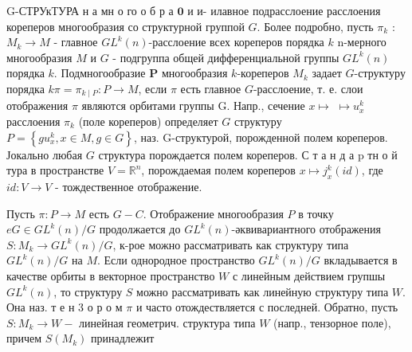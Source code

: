 \documentclass[10pt]{article}
\begin{document}
G-СТРУкТУРА н а мн о го о б р а $\mathbf{0}$ и и- илавное подрасслоение расслоения кореперов многообразия со структурной группой $G$. Более подробно, пусть $\pi_{k}$ : $M_{k} \rightarrow M$ - главное $G L^{k}(n)$-расслоение всех кореперов порядка $k$ n-мерного многообразия $M$ и $G$ - подгруппа общей дифференциальной группы $G L^{k}(n)$ порядка $k$. Подмногообразие $\boldsymbol{P}$ многообразия $k$-кореперов $M_{k}$ задает $G$-структуру порядка $k \pi=\pi_{k \mid P}: P \rightarrow M$, если $\pi$ есть главное $G$-расслоение, т. е. слои отображения $\pi$ являются орбитами группы G. Напр., сечение $x \mapsto$ $\mapsto u_{x}^{k}$ расслоения $\pi_{k}$ (поле кореперов) определяет $G$ структуру $P=\left\{g u_{x}^{k}, x \in M, g \in G\right\}$, наз. G-структурой, порожденной полем кореперов. Јокально любая $G$ структура порождается полем кореперов. С т а н д а $\mathrm{p}$ тн о й тура в пространстве $V=\mathbb{R}^{n}$, порождаемая полем кореперов $x \mapsto j_{x}^{k}(i d)$, где $i d: V \rightarrow V$ - тождественное отображение.



Пусть $\pi: P \rightarrow M$ есть $G-C$. Отображение многообразия $P$ в точку $e G \in G L^{k}(n) / G$ продолжается до $G L^{k}(n)$-әквивариантного отображения $S: M_{k} \rightarrow G L^{k}(n) / G$, к-рое можно рассматривать как структуру типа $G L^{k}(n) / G$ на $M$. Если однородное пространство $G L^{k}(n) / G$ вкладывается в качестве орбиты в векторное пространство $W$ с линейным действием групшы $G L^{k}(n)$, то структуру $S$ можно рассматривать как линейную структуру типа $W$. Она наз. т е н 3 о р о м $\pi$ и часто отождествляется с последней. Обратно, пусть $S: M_{k} \rightarrow W-$ линейная геометрич. структура типа $W$ (напр., тензорное поле), причем $S\left(M_{k}\right)$ принадлежит
\end{document}

